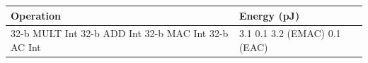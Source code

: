 \begin{tabular}{ll}
\toprule
Operation & Energy (pJ) \\
\midrule
32-b MULT Int 32-b ADD Int 32-b MAC Int 32-b AC Int & 3.1 0.1 3.2 (EMAC) 0.1 (EAC) \\
\bottomrule
\end{tabular}
